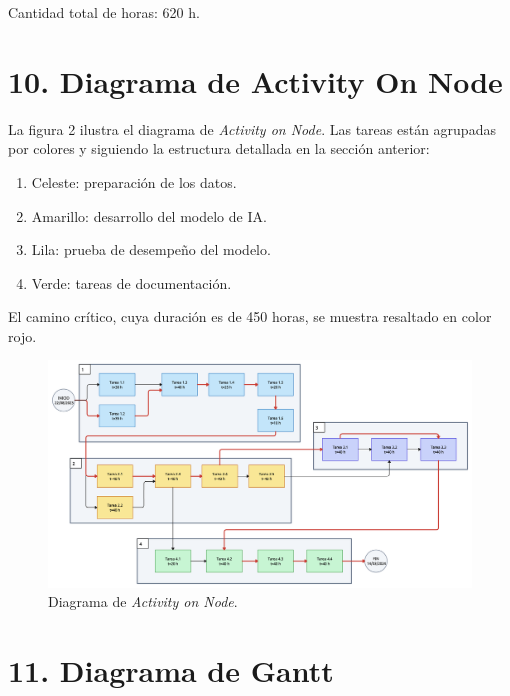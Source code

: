 \documentclass[
11pt, %
codirector, %
]{charter}
\begin{document}
Cantidad total de horas: 620 h.

\section{10. Diagrama de Activity On Node}
\label{sec:AoN}




La figura 2 ilustra el diagrama de \textit{Activity on Node}. Las tareas están agrupadas por colores y siguiendo la estructura detallada en la sección anterior:

\begin{enumerate}
	\item Celeste: preparación de los datos.
	\item Amarillo: desarrollo del modelo de IA.
	\item Lila: prueba de desempeño del modelo.
	\item Verde: tareas de documentación.
\end{enumerate}

El camino crítico, cuya duración es de 450 horas, se muestra resaltado en color rojo.


\begin{figure}[htpb]
\centering 
\includegraphics[width=.8\textwidth]{./Figuras/AoN3.png}
\caption{Diagrama de \textit{Activity on Node}.}
\label{fig:AoN}
\end{figure}


\pagebreak

\section{11. Diagrama de Gantt}
\label{sec:gantt}
\end{document}
